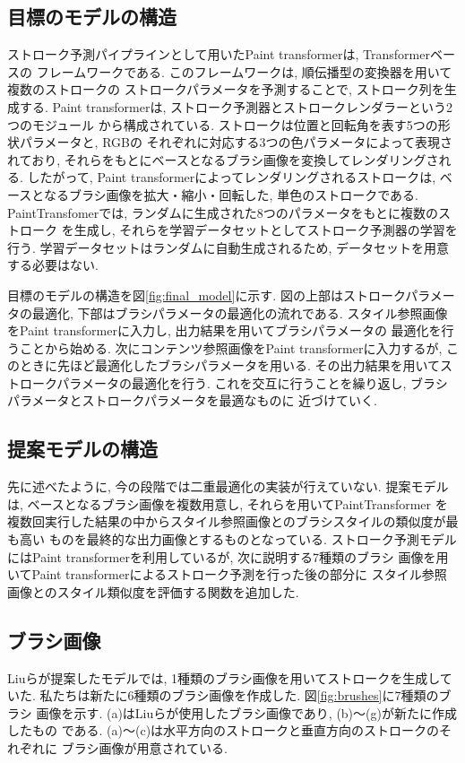 \documentclass[MIRU,submit,uplatex]{miru2023j}
\begin{document}
\subsection{目標のモデルの構造}
ストローク予測パイプラインとして用いたPaint transformerは, Transformerベースの
フレームワークである. 
このフレームワークは, 順伝播型の変換器を用いて複数のストロークの
ストロークパラメータを予測することで, ストローク列を生成する.
Paint transformerは, ストローク予測器とストロークレンダラーという2つのモジュール
から構成されている. ストロークは位置と回転角を表す5つの形状パラメータと, RGBの
それぞれに対応する3つの色パラメータによって表現されており, 
それらをもとにベースとなるブラシ画像を変換してレンダリングされる.
したがって, Paint transformerによってレンダリングされるストロークは, 
ベースとなるブラシ画像を拡大・縮小・回転した, 単色のストロークである.
PaintTransfomerでは, ランダムに生成された8つのパラメータをもとに複数のストローク
を生成し, それらを学習データセットとしてストローク予測器の学習を行う. 
学習データセットはランダムに自動生成されるため, データセットを用意する必要はない.

目標のモデルの構造を図\ref{fig:final_model}に示す. 
図の上部はストロークパラメータの最適化, 下部はブラシパラメータの最適化の流れである.
スタイル参照画像をPaint transformerに入力し, 出力結果を用いてブラシパラメータの
最適化を行うことから始める. 次にコンテンツ参照画像をPaint transformerに入力するが,
このときに先ほど最適化したブラシパラメータを用いる. 
その出力結果を用いてストロークパラメータの最適化を行う.
これを交互に行うことを繰り返し, ブラシパラメータとストロークパラメータを最適なものに
近づけていく. 


\subsection{提案モデルの構造}
先に述べたように, 今の段階では二重最適化の実装が行えていない. 
提案モデルは, ベースとなるブラシ画像を複数用意し, それらを用いてPaintTransformer
を複数回実行した結果の中からスタイル参照画像とのブラシスタイルの類似度が最も高い
ものを最終的な出力画像とするものとなっている.  
ストローク予測モデルにはPaint transformerを利用しているが, 次に説明する7種類のブラシ
画像を用いてPaint transformerによるストローク予測を行った後の部分に
スタイル参照画像とのスタイル類似度を評価する関数を追加した.

\subsection{ブラシ画像}
Liuらが提案したモデルでは, 1種類のブラシ画像を用いてストロークを生成していた.
私たちは新たに6種類のブラシ画像を作成した. 図\ref{fig:brushes}に7種類のブラシ
画像を示す. (a)はLiuらが使用したブラシ画像であり, (b)～(g)が新たに作成したもの
である. (a)～(c)は水平方向のストロークと垂直方向のストロークのそれぞれに
ブラシ画像が用意されている. 
\end{document}
